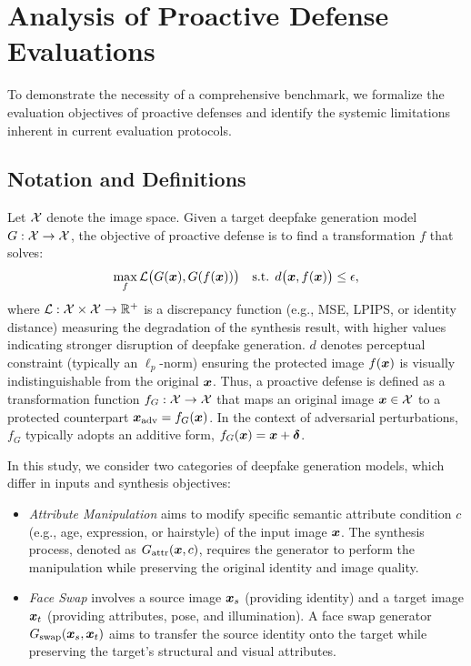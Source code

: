 \documentclass{article}
\begin{document}

\section{Analysis of Proactive Defense Evaluations}
\label{sec:analysis}
To demonstrate the necessity of a comprehensive benchmark, we formalize the evaluation objectives of proactive defenses and identify the systemic limitations inherent in current evaluation protocols.

\subsection{Notation and Definitions}
\label{sec:definition}
Let ${\mathcal{X}}$ denote the image space. Given a target deepfake generation model $G: {\mathcal{X}} \rightarrow {\mathcal{X}}$, the objective of proactive defense is to find a transformation $f$ that solves:
\begin{equation}
\label{eq:proactive_obj}
\max_f {\mathcal{L}}\big(G({\bm{x}}), G(f({\bm{x}}))\big) \quad \text{s.t. } d\big({\bm{x}}, f({\bm{x}})\big) \leq \epsilon,
\end{equation}
where ${\mathcal{L}}: {\mathcal{X}} \times {\mathcal{X}} \rightarrow \mathbb{R}^{+}$ is a discrepancy function (e.g., MSE, LPIPS, or identity distance) measuring the degradation of the synthesis result, with higher values indicating stronger disruption of deepfake generation. $d$ denotes perceptual constraint (typically an $\ell_p$-norm) ensuring the protected image $f({\bm{x}})$ is visually indistinguishable from the original ${\bm{x}}$. Thus, a proactive defense is defined as a transformation function $f_G: {\mathcal{X}}\rightarrow {\mathcal{X}}$ that maps an original image ${\bm{x}} \in {\mathcal{X}}$ to a protected counterpart ${\bm{x}}_{\text{adv}} = f_G({\bm{x}})$.  In the context of adversarial perturbations, $f_G$ typically adopts an additive form, $f_G({\bm{x}}) = {\bm{x}} + \bm{\delta}$.

In this study, we consider two categories of deepfake generation models, which differ in inputs and synthesis objectives:
\begin{itemize}[leftmargin=*, nosep]
    \item \emph{Attribute Manipulation} aims to modify specific semantic attribute condition $c$ (e.g., age, expression, or hairstyle) of the input image ${\bm{x}}$. The synthesis process, denoted as $G_{\text{attr}}({\bm{x}}, c)$, requires the generator to perform the manipulation while preserving the original identity and image quality.
    \item \emph{Face Swap} involves a source image ${\bm{x}}_s$ (providing identity) and a target image ${\bm{x}}_t$ (providing attributes, pose, and illumination). A face swap generator $G_{\mathrm{swap}}({\bm{x}}_s, {\bm{x}}_t)$ aims to transfer the source
    identity onto the target while preserving the target’s structural and visual attributes.
\end{itemize}
\end{document}
